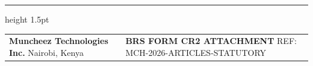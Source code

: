 \documentclass[11pt,a4paper]{article}
\begin{document}
\vfill

\color{RuleNavy}\hrule height 1.5pt
\vspace{0.3cm}

\begin{tabularx}{\textwidth}{@{} X >{\raggedleft\arraybackslash}X @{}}
    \textsf{\small\bfseries\color{CorporateNavy} Muncheez Technologies Inc.} \newline
    \textsf{\scriptsize\color{SolidBlack} Nairobi, Kenya} &
    \textsf{\small\bfseries\color{CorporateNavy} BRS FORM CR2 ATTACHMENT} \newline
    \textsf{\scriptsize\color{SolidBlack} REF: MCH-2026-ARTICLES-STATUTORY} \\
\end{tabularx}
\end{document}
